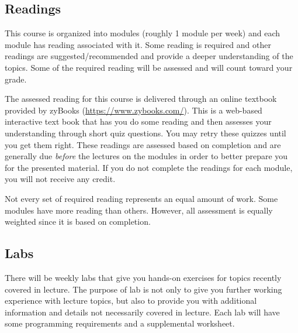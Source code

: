 \documentclass[12pt]{scrartcl}
\begin{document}
%

\subsection{Readings}

This course is organized into modules (roughly 1 module per week) and
each module has reading associated with it.  Some reading is required
and other readings are suggested/recommended and provide a deeper
understanding of the topics.  Some of the required reading will be
assessed and will count toward your grade.

The assessed reading for this course is delivered through an online
textbook provided by zyBooks (\url{https://www.zybooks.com/}).  This
is a web-based interactive text book that has you do some reading and
then assesses your understanding through short quiz questions.  You may retry
these quizzes until you get them right.  These readings are assessed 
based on completion and are generally due \emph{before} the lectures
on the modules in order to better prepare you for the presented material.
If you do not complete the readings for each module, you will not receive
any credit.  

Not every set of required reading represents an equal amount of work.
Some modules have more reading than others.  However, all assessment
is equally weighted since it is based on completion.


\subsection{Labs}

There will be weekly labs that give you hands-on exercises for 
topics recently covered in lecture.  The purpose of lab is not 
only to give you further working experience with lecture topics, 
but also to provide you with additional information and details 
not necessarily covered in lecture.  Each lab will have some 
programming requirements and a supplemental worksheet.  
\end{document}
